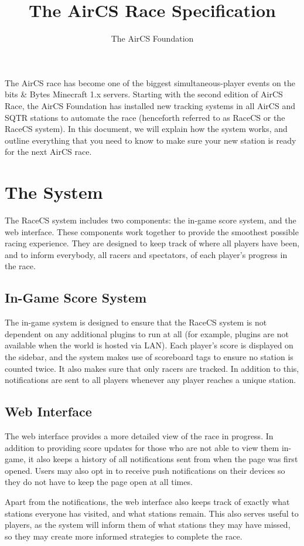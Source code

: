 \documentclass{article}
\title{The \textbf{{\color{red}Air}CS} Race Specification}
\author{The AirCS Foundation}
\begin{document}
\maketitle
The AirCS race has become one of the biggest simultaneous-player events on the bits \& Bytes Minecraft 1.x servers. Starting with the second edition of AirCS Race, the AirCS Foundation has installed new tracking systems in all AirCS and SQTR stations to automate the race (henceforth referred to as RaceCS or the RaceCS system). In this document, we will explain how the system works, and outline everything that you need to know to make sure your new station is ready for the next AirCS race.

\section{The System}
The RaceCS system includes two components: the in-game score system, and the web interface. These components work together to provide the smoothest possible racing experience. They are designed to keep track of where all players have been, and to inform everybody, all racers and spectators, of each player's progress in the race.

\subsection{In-Game Score System}
The in-game system is designed to ensure that the RaceCS system is not dependent on any additional plugins to run at all (for example, plugins are not available when the world is hosted via LAN). Each player's score is displayed on the sidebar, and the system makes use of scoreboard tags to ensure no station is counted twice. It also makes sure that only racers are tracked. In addition to this, notifications are sent to all players whenever any player reaches a unique station.

\subsection{Web Interface}
The web interface provides a more detailed view of the race in progress. In addition to providing score updates for those who are not able to view them in-game, it also keeps a history of all notifications sent from when the page was first opened. Users may also opt in to receive push notifications on their devices so they do not have to keep the page open at all times.

Apart from the notifications, the web interface also keeps track of exactly what stations everyone has visited, and what stations remain. This also serves useful to players, as the system will inform them of what stations they may have missed, so they may create more informed strategies to complete the race. 
\end{document}
